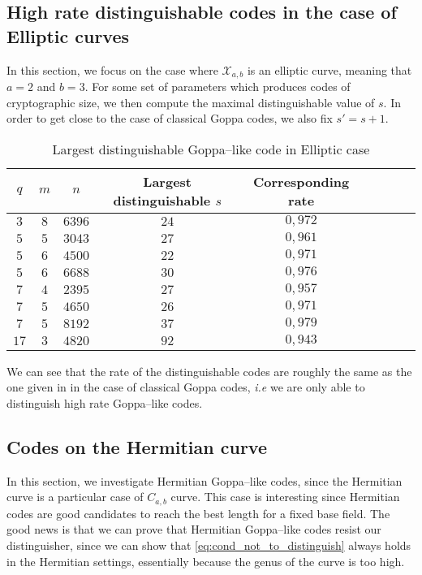 \documentclass[a4paper]{article}
\theoremstyle{definition}
\theoremstyle{remark}
\newcommand{\calX}{\mathcal{X}}
\begin{document}
\subsection{High rate distinguishable codes in the case of Elliptic curves}

In this section, we focus on the case where $\calX_{a,b}$ is an elliptic curve, meaning that $a=2$ and $b=3$. For some set of parameters which produces codes of cryptographic size, we then compute the maximal distinguishable value of $s$. In order to get close to the case of classical Goppa codes, we also fix $s'=s+1$.

\begin{table}[h]
\begin{center}
\begin{tabular}{|c|c|c||c|c|c|c|c|c|}
    \hline
    $q$ & $m$ & $n$ & Largest distinguishable $s$ & Corresponding rate\\
    \hline
     $3$ & $8$ & $6396$ & $24$ & $0,972$ \\
    \hline \hline
     $5$ & $5$ & $3043$ & $27$ & $0,961$  \\
    \hline
     $5$ & $6$ & $4500$ & $22$ & $0,971$ \\
    \hline
     $5$  & $6$ & $6688$ & $30$ & $0,976$ \\
    \hline \hline
     $7$ & $4$ & $2395$ & $27$ & $0,957$ \\
    \hline
      $7$ & $5$ & $4650$ & $26$ & $0,971$ \\
    \hline
      $7$ & $5$ & $8192$ & $37$ & $0,979$ \\
    \hline \hline
      $17$ & $3$ & $4820$ & $92$ & $0,943$ \\
    \hline
\end{tabular}
\caption{Largest distinguishable Goppa--like code in Elliptic case}
\end{center}
\end{table}

We can see that the rate of the distinguishable codes are roughly the same as the one given in \cite{MT21} in the case of classical Goppa codes, \emph{i.e} we are only able to distinguish high rate Goppa--like codes.



\subsection{Codes on the Hermitian curve}

In this section, we investigate Hermitian Goppa--like codes, since the Hermitian curve is a particular case of $C_{a,b}$ curve. This case is interesting since Hermitian codes are good candidates to reach the best length for a fixed base field. The good news is that we can prove that Hermitian Goppa--like codes resist our distinguisher, since we can show that \eqref{eq:cond_not_to_distinguish} always holds in the Hermitian settings, essentially because  the genus of the curve is too high. 
\end{document}
